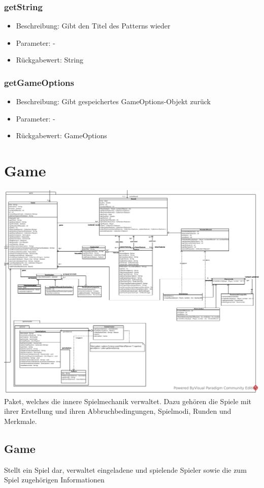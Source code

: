 \documentclass[a4paper]{scrreprt}
\begin{document}
	\subsubsection{getString}
	\begin{itemize}
		\item Beschreibung: Gibt den Titel des Patterns wieder
		\item Parameter: -
		\item Rückgabewert: String
	\end{itemize}
	\subsubsection{getGameOptions}
	\begin{itemize}
		\item Beschreibung: Gibt gespeichertes GameOptions-Objekt zurück
		\item Parameter: -
		\item Rückgabewert: GameOptions
	\end{itemize}

	\section{Game}
	\includegraphics[width=\textwidth]{img/package/game.pdf}
	Paket, welches die innere Spielmechanik verwaltet. Dazu gehören die Spiele mit ihrer Erstellung und ihren Abbruchbedingungen, Spielmodi, Runden und Merkmale.

	\subsection{Game}
	Stellt ein Spiel dar, verwaltet eingeladene und spielende Spieler sowie die zum Spiel zugehörigen Informationen
\end{document}
